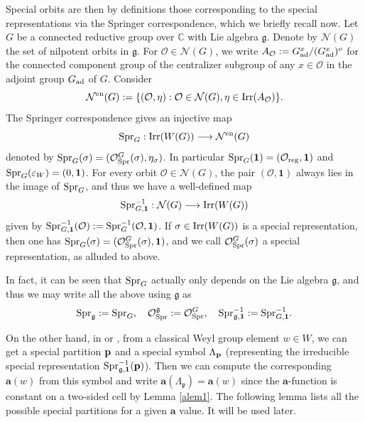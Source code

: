 \documentclass[reqno,12pt]{amsart}
\numberwithin{equation}{section}
\theoremstyle{plain}
\theoremstyle{definition}
\newcommand{\aff}{ \mathbf{a} }
\begin{document}
Special orbits are then by definitions those corresponding to the special representations via the Springer correspondence, which we briefly recall now. Let $G$ be a connected reductive group over $\mathbb{C}$ with Lie algebra $\mathfrak{g}$. Denote by $\mathcal{N}(G)$ the set of nilpotent orbits in $\mathfrak{g}$. For $\mathcal{O} \in \mathcal{N}(G)$, we write $A_\mathcal{O}:=G_{\rm ad}^x/(G_{\rm ad}^x)^o$ for the connected component group of the centralizer subgroup  of any $x\in \mathcal{O}$ in the adjoint group $G_{\rm ad}$ of $G$. Consider
$$\mathcal{N}^{\rm en}(G):=\{(\mathcal{O}, \eta): \mathcal{O} \in \mathcal{N}(G), \eta \in {\rm Irr}(A_\mathcal{O}) \}.$$
The Springer correspondence gives an injective map
\begin{equation} \label{Spr}
  {\rm Spr}_G: {\rm Irr}(W(G)) \longrightarrow \mathcal{N}^{\rm en}(G)  
\end{equation}
denoted by ${\rm Spr}_G(\sigma) = (\mathcal{O}_{\rm Spr}^G(\sigma), \eta_\sigma)$. In particular ${\rm Spr}_G(\mathbf{1})=(\mathcal{O}_{\rm reg}, \mathbf{1})$ and ${\rm Spr}_G(\varepsilon_W)=(0, \mathbf{1})$. 
For every orbit $\mathcal{O} \in \mathcal{N}(G)$, the pair $(\mathcal{O}, \mathbf{1})$ always lies in the image of ${\rm Spr}_G$, and thus we have a well-defined map
$${\rm Spr}_{G, \mathbf{1}}^{-1}: \mathcal{N}(G) \longrightarrow {\rm Irr}(W(G))$$
given by ${\rm Spr}_{G,\mathbf{1}}^{-1}(\mathcal{O}):= {\rm Spr}_G^{-1}(\mathcal{O}, \mathbf{1})$.  If $\sigma \in {\rm Irr}(W(G))$ is a special representation, then one has ${\rm Spr}_G(\sigma) = (\mathcal{O}_{\rm Spr}^G(\sigma), \mathbf{1})$, and we call $\mathcal{O}_{\rm Spr}^G(\sigma)$ a special representation, as alluded to above.

In fact, it can be seen that ${\rm Spr}_G$ actually only depends on the Lie algebra $\mathfrak{g}$, and thus we may write all the above using $\mathfrak{g}$ as
$${\rm Spr}_\mathfrak{g}:={\rm Spr}_G, \quad \mathcal{O}_{\rm Spr}^\mathfrak{g}:=\mathcal{O}_{\rm Spr}^G, \quad {\rm Spr}_{\mathfrak{g}, \mathbf{1}}^{-1}:={\rm Spr}_{G, \mathbf{1}}^{-1}.$$











On the other hand, in \cite{BXX} or \cite{BMW},  from a classical Weyl group element $w\in W$, we can get a special  partition ${\bf p}$ and a special symbol $\Lambda_{\bf p}$ (representing the irreducible special representation ${\rm Spr}_{\mathfrak{g}, \mathbf{1}}^{-1}({\bf p})$). Then we  can compute the corresponding $\aff(w)$ from this symbol and write $\aff(\Lambda_{\mathfrak{p}})=\aff(w)$ since the $\aff$-function is constant on a two-sided cell by Lemma \ref{alem1}. The following lemma lists all the possible special partitions for a given $\aff$ value. It will be used later.
\end{document}
